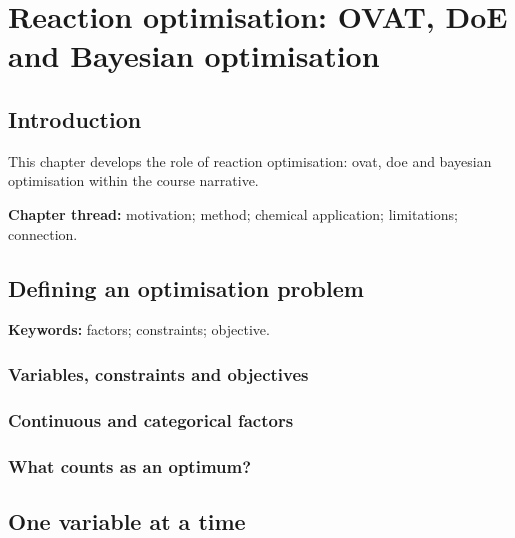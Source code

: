 
\chapter{Reaction optimisation: OVAT, DoE and Bayesian optimisation}

\section{Introduction}

This chapter develops the role of reaction optimisation: ovat, doe and bayesian optimisation within the course narrative.

\begin{insightbox}
\textbf{Chapter thread:} motivation; method; chemical application; limitations; connection.
\end{insightbox}

\section{Defining an optimisation problem}

\begin{conceptbox}
\textbf{Keywords:} factors; constraints; objective.
\end{conceptbox}

\subsection{Variables, constraints and objectives}


\subsection{Continuous and categorical factors}


\subsection{What counts as an optimum?}


\section{One variable at a time}


